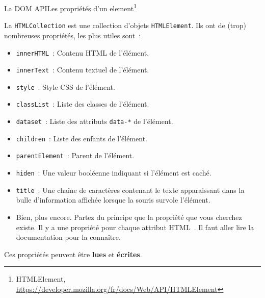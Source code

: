 \documentclass{beamer}
\begin{document}
    \begin{frame}{La DOM API}{Les propriétés d'un element\footnote{HTMLElement, \url{https://developer.mozilla.org/fr/docs/Web/API/HTMLElement}}}
        \begin{scriptsize}
            La \lstinline{HTMLCollection} est une collection d'objets \lstinline{HTMLElement}.
            Ils ont de (trop) nombreuses propriétés, les plus utiles sont~:
            \begin{itemize}
                \item \lstinline{innerHTML}~: Contenu HTML de l'élément.
                \item \lstinline{innerText}~: Contenu textuel de l'élément.
                \item \lstinline{style}~: Style CSS de l'élément.
                \item \lstinline{classList}~: Liste des classes de l'élément.
                \item \lstinline{dataset}~: Liste des attributs \lstinline{data-*} de l'élément.
                \item \lstinline{children}~: Liste des enfants de l'élément.
                \item \lstinline{parentElement}~: Parent de l'élément.
                \item \lstinline{hiden}~: Une valeur booléenne indiquant si l'élément est caché.
                \item \lstinline{title}~: Une chaîne de caractères contenant le texte apparaissant dans la bulle d'information affichée lorsque la souris survole l'élément.
                \item Bien, plus encore.
                Partez du principe que la propriété que vous cherchez existe.
                Il y a une propriété pour chaque attribut HTML~.
                Il faut aller lire la documentation pour la connaître.
            \end{itemize}
            \begin{dangercolorbox}
                Ces propriétés peuvent être \textbf{lues} et \textbf{écrites}.
            \end{dangercolorbox}
        \end{scriptsize}
    \end{frame}
\end{document}
